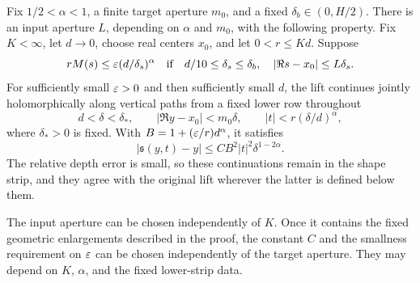 \begin{theorem}\label{thm:cone}
Fix \(1/2<\alpha<1\), a finite target aperture \(m_0\), and a fixed
\(\delta_b\in(0,H/2)\). There is an input aperture \(L\), depending on
\(\alpha\) and \(m_0\), with the following property. Fix \(K<\infty\),
let \(d\to0\), choose real centers \(x_0\), and let \(0<r\le Kd\).
Suppose
\begin{equation}\label{cone:input}
 rM(s)\le\varepsilon(d/\delta_s)^\alpha
 \quad\text{if}\quad
 d/10\le\delta_s\le\delta_b,
 \quad |\Re s-x_0|\le L\delta_s.
\end{equation}
For sufficiently small \(\varepsilon>0\) and then sufficiently small \(d\),
the lift continues jointly holomorphically along vertical paths from a
fixed lower row throughout
\begin{equation}\label{cone:target}
 d<\delta<\delta_*,\qquad
 |\Re y-x_0|<m_0\delta,\qquad
 |t|<r(\delta/d)^\alpha,
\end{equation}
where \(\delta_*>0\) is fixed. With
\(B=1+(\varepsilon/r)d^\alpha\), it satisfies
\begin{equation}\label{cone:passage-estimate}
 |\mathfrak s(y,t)-y|
 \le C B^2|t|^2\delta^{1-2\alpha}.
\end{equation}
The relative depth error is small, so these continuations remain in the
shape strip, and they agree with the original lift wherever the latter
is defined below them.

The input aperture can be chosen independently of \(K\). Once it
contains the fixed geometric enlargements described in the proof, the
constant \(C\) and the smallness requirement on \(\varepsilon\) can be chosen
independently of the target aperture. They may depend on \(K\),
\(\alpha\), and the fixed lower-strip data.
\end{theorem}



